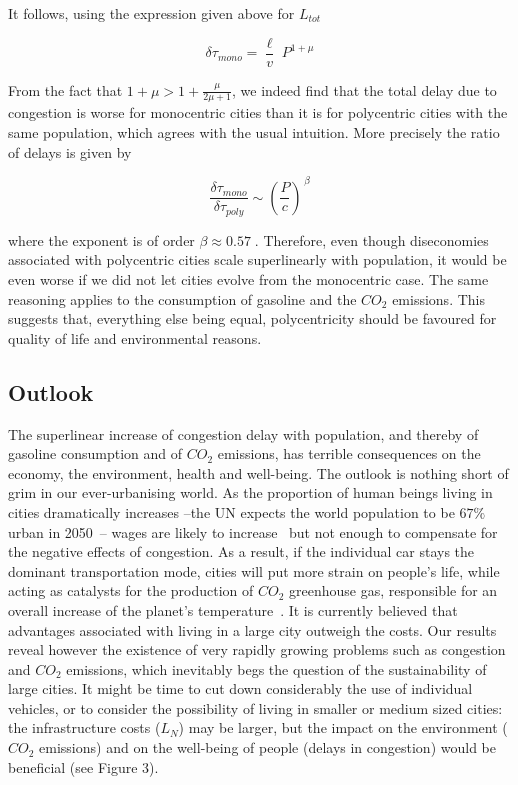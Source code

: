 It follows, using the expression given above for $L_{tot}$

\begin{equation}
    \delta\tau_{mono} = \frac{\ell}{v}\; P^{1+\mu}
\end{equation}

From the fact that $1+\mu > 1+\frac{\mu}{2\mu+1}$, we indeed find that the total delay due to
congestion is worse for monocentric cities than it is for polycentric cities with the same population, which agrees with the usual intuition. More precisely the ratio of delays is given by

\begin{equation}
    \frac{\delta\tau_{mono}}{\delta\tau_{poly}}\sim
    \left(\frac{P}{c}\right)^{\,\beta}
\end{equation}

where the exponent is of order $\beta \approx 0.57\;$. Therefore, even though diseconomies associated with polycentric cities scale superlinearly with population, it would be even worse if we did not let cities evolve from the monocentric case. The same reasoning applies to the consumption of gasoline and the $CO_2$ emissions. This suggests that, everything else being equal, polycentricity should be favoured for quality of life and environmental reasons.


\subsection{Outlook}

The superlinear increase of congestion delay with population, and thereby of gasoline consumption and of $CO_2$ emissions, has terrible consequences on the economy, the environment, health and well-being. The outlook is nothing short of grim in our ever-urbanising world. As the proportion of human beings living in cities dramatically increases --the UN expects the world population to be $67\%$ urban in 2050~\cite{UN:2011}-- wages are likely to increase~\cite{Bettencourt:2007} but not enough to compensate for the negative effects of congestion. As a result, if the individual car stays the dominant transportation mode, cities will put more strain on people's life, while acting as catalysts for the production of $CO_2$ greenhouse gas, responsible for an overall increase of the planet's temperature~\cite{Oreskes:2004}. It is currently believed that advantages associated with living in a large city outweigh the costs. Our results reveal however the existence of very rapidly growing problems such as congestion and $CO_2$ emissions, which inevitably begs the question of the sustainability of large cities. It might be time to cut down considerably the use of individual vehicles, or to consider the possibility of living in smaller or medium sized cities: the infrastructure costs ($L_N$) may be larger, but the impact on the environment ($CO_2$ emissions) and on the well-being of people (delays in congestion) would be beneficial (see Figure 3).


